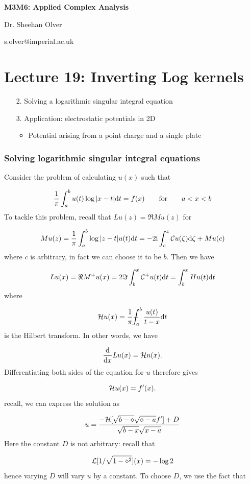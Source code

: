 \documentclass[12pt,a4paper]{article}
\def\qqfor{\qquad\hbox{for}\qquad}
\def\D{ {\rm d} }
\def\I{ {\rm i} }
\def\CC{ {\cal C} }
\def\HH{ {\cal H} }
\def\LL{ {\cal L} }
\def\Xint#1{ \mathchoice
   {\XXint\displaystyle\textstyle{#1} }%
   {\XXint\textstyle\scriptstyle{#1} }%
   {\XXint\scriptstyle\scriptscriptstyle{#1} }%
   {\XXint\scriptscriptstyle\scriptscriptstyle{#1} }%
   \!\int}
\def\XXint#1#2#3{ {\setbox0=\hbox{$#1{#2#3}{\int}$}
     \vcenter{\hbox{$#2#3$}}\kern-.5\wd0} }
\def\dashint{\Xint-}
\def\dx{\D x}
\def\dt{\D t}
\begin{document}
\textbf{M3M6: Applied Complex Analysis}

Dr. Sheehan Olver

s.olver@imperial.ac.uk

\section{Lecture 19: Inverting Log kernels}
\begin{itemize}
\item[2. ] Solving a logarithmic singular integral equation


\item[3. ] Application: electrostatic potentials in 2D

\begin{itemize}
\item Potential arising from a point charge and a single plate

\end{itemize}
\end{itemize}
\subsubsection{Solving logarithmic singular integral equations}
Consider the problem of calculating $u(x)$ such that

\[
{1 \over \pi} \int_a^b u(t) \log | x-t| \dt = f(x) \qqfor a < x < b
\]
To tackle this problem, recall that $L u(z) = \Re M u(z)$ for

\[
M u(z) = {1 \over \pi} \int_a^b \log|z-t| u(t) \D t =  -2 \I \int_c^z \CC u(\zeta) \D \zeta + M u(c)
\]
where $c$ is arbitrary, in fact we can choose it to be $b$. Then we have

\[
L u(x) =  \Re M^+ u(x) = 2\Im \int_b^x \CC^+ u(t) \D t =  \int_b^x H u(t) \D t
\]
where 

\[
\HH u(x) = {1 \over \pi} \dashint_a^b {u(t) \over t -x } \D t
\]
is the Hilbert transform. In other words, we have

\[
{\D \over \dx} L u(x) = \HH u(x).
\]
Differentiating both sides of the equation for $u$ therefore gives

\[
\HH u(x) = f'(x).
\]
recall, we can express the solution as

\[
    u = {-\HH[\sqrt{b-\diamond}\sqrt{\diamond-a} f'] + D \over \sqrt{b-x}\sqrt{x-a}} 
\]
Here the constant $D$ is not arbitrary: recall that

\[
\LL[1/\sqrt{1-\diamond^2}](x) = - \log 2
\]
hence varying $D$ will vary $u$ by a constant. To choose $D$,  we use the fact that
\end{document}
